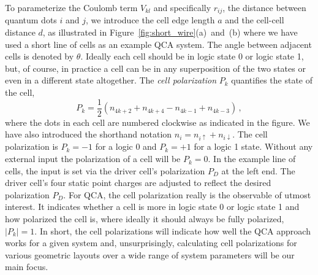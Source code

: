 To parameterize the Coulomb term $V_{kl}$ and specifically $r_{ij}$, the
distance between quantum dots $i$ and $j$, we introduce the cell edge length $a$
and the cell-cell distance $d$, as illustrated in
Figure~\ref{fig:short_wire}(a)~and~(b) where we have used a short line of cells
as an example QCA system. The angle between adjacent cells is denoted by
$\theta$. Ideally each cell should be in logic state 0 or logic state 1, but,
of course, in practice a cell can be in any superposition of the two states or
even in a different state altogether. The \emph{cell polarization} $P_k$
quantifies the state of the cell,
\begin{equation}
  \label{eq:polarization}
  P_k = \frac{1}{2} \left( n_{4k+2} + n_{4k+4} - n_{4k-1} + n_{4k-3} \right) \, ,
\end{equation}
where the dots in each cell are numbered clockwise as indicated in the figure.
We have also introduced the shorthand notation $n_i = n_{i\uparrow} +
n_{i\downarrow}$. The cell polarization is $P_k = -1$ for a logic 0 and $P_k =
+1$ for a logic 1 state. Without any external input the polarization of a cell
will be $P_k = 0$. In the example line of cells, the input is set via the
driver cell's polarization $P_D$ at the left end. The driver cell's four static
point charges are adjusted to reflect the desired polarization $P_D$. For QCA,
the cell polarization really is the observable of utmost interest. It indicates
whether a cell is more in logic state 0 or logic state 1 and how polarized the
cell is, where ideally it should always be fully polarized, $|P_k| = 1$. In
short, the cell polarizations will indicate how well the QCA approach works for
a given system and, unsurprisingly, calculating cell polarizations for various
geometric layouts over a wide range of system parameters will be our main focus.

